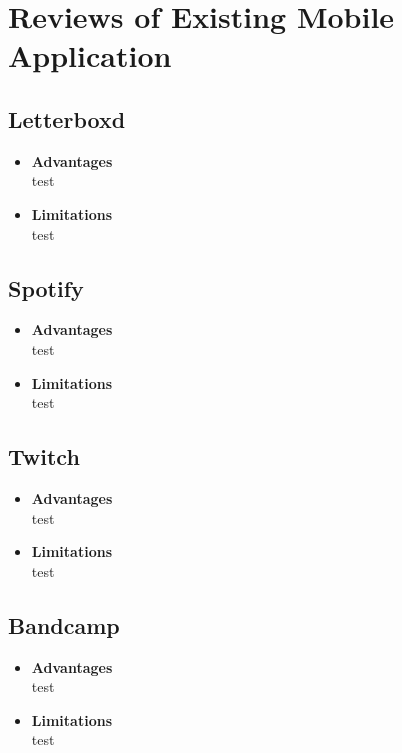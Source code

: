 \section{Reviews of Existing Mobile Application}

\subsection{Letterboxd}

\begin{itemize}[\label{}]
    \item \textbf{Advantages} \\
    test

    \item \textbf{Limitations} \\
    test
\end{itemize}

\subsection{Spotify}

\begin{itemize}[\label{}]
    \item \textbf{Advantages} \\
    test

    \item \textbf{Limitations} \\
    test
\end{itemize}

\subsection{Twitch}

\begin{itemize}[\label{}]
    \item \textbf{Advantages} \\
    test

    \item \textbf{Limitations} \\
    test
\end{itemize}

\subsection{Bandcamp}

\begin{itemize}[\label{}]
    \item \textbf{Advantages} \\
    test

    \item \textbf{Limitations} \\
    test
\end{itemize}


